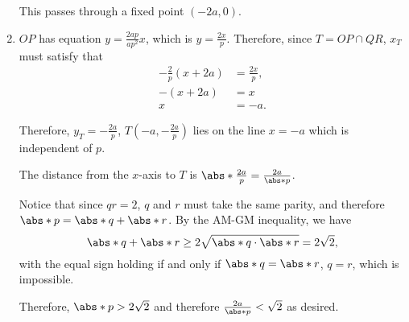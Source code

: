 \begin{enumerate}
          This passes through a fixed point \((-2a, 0)\).

    \item \(OP\) has equation \(y = \frac{2ap}{ap^2}x\), which is \(y = \frac{2x}{p}\).
          Therefore, since \(T = OP \cap QR\), \(x_T\) must satisfy that
          \begin{align*}
              -\frac{2}{p} (x + 2a) & = \frac{2x}{p}, \\
              -(x + 2a)             & = x             \\
              x                     & = -a.
          \end{align*}

          Therefore, \(y_T = -\frac{2a}{p}\), \(T\left(-a, -\frac{2a}{p}\right)\) lies on the line \(x = -a\) which is independent of \(p\).

          The distance from the \(x\)-axis to \(T\) is \(\abs*{\frac{2a}{p}} = \frac{2a}{\abs*{p}}\).

          Notice that since \(qr = 2\), \(q\) and \(r\) must take the same parity, and therefore \(\abs*{p} = \abs*{q} + \abs*{r}\). By the AM-GM inequality, we have
          \[
              \abs*{q} + \abs*{r} \geq 2 \sqrt{\abs*{q} \cdot \abs*{r}} = 2\sqrt{2},
          \]
          with the equal sign holding if and only if \(\abs*{q} = \abs*{r}\), \(q = r\), which is impossible.

          Therefore, \(\abs*{p} > 2\sqrt{2}\) and therefore \(\frac{2a}{\abs*{p}} < \sqrt{2}\) as desired.
\end{enumerate}